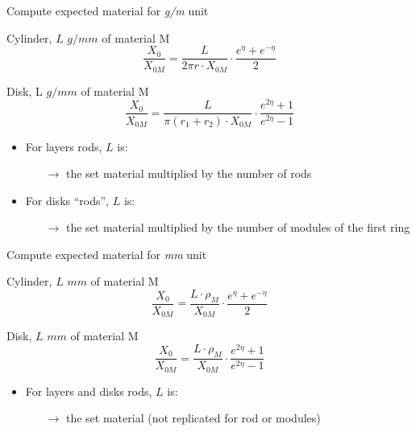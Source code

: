\documentclass[pdftex, 11pt]{beamer}
\begin{document}
\begin{frame}{Compute expected material for \emph{g/m} unit}
  \begin{block}{Cylinder, \alert{$L$} $g/mm$ of material \alert{M}}
    $$
    \frac{X_0}{X_{0M}} = \frac{L}{2\pi r \cdot X_{0M}} \cdot \frac{e^\eta+e^{-\eta}}{2}
    $$
  \end{block}
  \begin{block}{Disk, \alert{L} $g/mm$ of material \alert{M}}
    $$
    \frac{X_0}{X_{0M}} = \frac{L}{\pi(r_1+r_2)\cdot X_{0M}}\cdot\frac{e^{2\eta}+1}{e^{2\eta}-1}
    $$
  \end{block}

  \begin{itemize}
  \item For \alert{layers} rods, \alert{$L$} is:
    \begin{itemize}
    \item [$\to$] the set material multiplied by the number of rods
    \end{itemize}
  \item For \alert{disks} ``rods'', \alert{$L$} is:
    \begin{itemize}
    \item [$\to$] the set material multiplied by the number of modules of the first ring
    \end{itemize}
  \end{itemize}
\end{frame}

\begin{frame}{Compute expected material for \emph{mm} unit}
  \begin{block}{Cylinder, \alert{$L$} $mm$ of material \alert{M}}
    $$
    \frac{X_0}{X_{0M}} = \frac{L\cdot\rho_M}{X_{0M}}\cdot\frac{e^\eta+e^{-\eta}}{2}
    $$
  \end{block}
  \begin{block}{Disk, \alert{$L$} $mm$ of material \alert{M}}
    $$
    \frac{X_0}{X_{0M}} = \frac{L\cdot\rho_M}{X_{0M}}\cdot\frac{e^{2\eta}+1}{e^{2\eta}-1}
    $$
  \end{block}

  \begin{itemize}
  \item For \alert{layers} and \alert{disks} rods, \alert{$L$} is:
    \begin{itemize}
    \item[$\to$] the set material (not replicated for rod or modules)
    \end{itemize}
  \end{itemize}
\end{frame}
\end{document}
